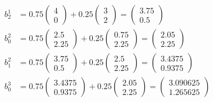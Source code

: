 \documentclass[a4paper]{scrartcl}
\begin{document}
\begin{itemize}
\begin{align*}
        b_2^1&=0.75 \begin{pmatrix}4\\ 0 \end{pmatrix} + 0.25  \begin{pmatrix}3\\ 2 \end{pmatrix} =  \begin{pmatrix}3.75\\ 0.5 \end{pmatrix}\\
        b_0^2&=0.75 \begin{pmatrix}2.5\\ 2.25 \end{pmatrix} + 0.25  \begin{pmatrix}0.75\\ 2.25 \end{pmatrix} =  \begin{pmatrix}2.05\\ 2.25 \end{pmatrix}\\
        b_1^2&=0.75 \begin{pmatrix}3.75\\ 0.5 \end{pmatrix} + 0.25  \begin{pmatrix}2.5\\ 2.25 \end{pmatrix} =  \begin{pmatrix}3.4375\\  0.9375 \end{pmatrix}\\
        b_0^3&=0.75 \begin{pmatrix}3.4375\\  0.9375 \end{pmatrix} + 0.25  \begin{pmatrix}2.05\\ 2.25 \end{pmatrix} =  \begin{pmatrix}3.090625\\ 1.265625 \end{pmatrix}\\
      \end{align*}
  \end{itemize}

\end{document}
